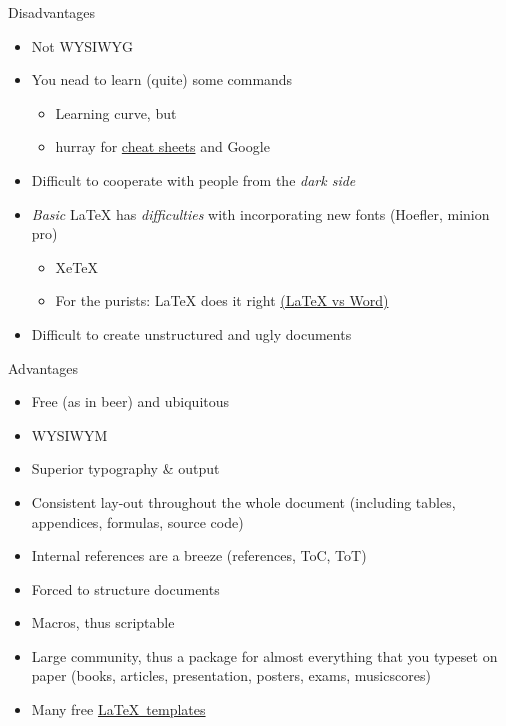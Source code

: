 \documentclass[ignorenonframetext]{beamer}
\begin{document}
{\begin{frame}{Disadvantages}
\begin{itemize}
\item
  Not WYSIWYG
\item
  You nead to learn (quite) some commands

  \begin{itemize}
  \item
    Learning curve, but
  \item
    hurray for
    \href{https://wch.github.io/latexsheet/latexsheet.pdf}{cheat sheets}
    and Google
  \end{itemize}
\item
  Difficult to cooperate with people from the \emph{dark side}
\item
  \emph{Basic} \LaTeX{} has \emph{difficulties} with incorporating new
  fonts (Hoefler, minion pro)

  \begin{itemize}
  \item
    XeTeX  \item
    For the purists: \LaTeX{} does it right
    \href{http://oestrem.com/thingstwice/2007/05/latex-vs-word-vs-writer/}{(\LaTeX{}
    vs Word)}
  \end{itemize}
  \item Difficult to create unstructured and ugly documents
\end{itemize}

\end{frame}

\begin{frame}{Advantages}

\begin{itemize}
\item Free (as in beer) and ubiquitous
\item WYSIWYM
\item Superior typography \& output  
\item Consistent lay-out throughout the whole document (including tables,
	  appendices, formulas, source code)
\item Internal references are a breeze (references, ToC, ToT)
\item Forced to structure documents
\item Macros, thus scriptable
\item Large community, thus a package for almost everything that you typeset on paper (books, articles, presentation, posters, exams, musicscores)
\item Many free \href{https://www.overleaf.com/latex/templates/}{\LaTeX~templates}
\end{itemize}


\end{frame}}
\end{document}
